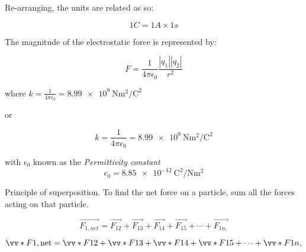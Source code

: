 \documentclass[letterpaper,12pt]{article}
\begin{document}
Re-arranging, the units are related as so:

\begin{equation}
	1C = 1A \times 1s
\end{equation}

The magnitude of the electrostatic force is represented by:

\begin{equation}
	F = \frac{1}{4\pi\epsilon_0}\frac{|q_1||q_2|}{r^2}
\end{equation}


where $k = \frac{1}{4\pi\epsilon_0} = \SI{8.99e9}{\newton\meter\squared\per\coulomb\squared}$

or

\begin{equation}
	k = \frac{1}{4\pi\epsilon_0} = \SI{8.99e9}{\newton\meter\squared\per\coulomb\squared}
\end{equation}

with $\epsilon_0$ known as the \textit{Permittivity constant}
\begin{equation}
	\epsilon_0 = \SI{8.85e-12}{\coulomb\squared\per\newton\meter\squared}
\end{equation}

Principle of superposition. To find the net force on a particle, sum all the forces acting on that
particle.

\begin{equation}
	\vec{F_{1,net}} = \vec{F_{12}} + \vec{F_{13}} + \vec{F_{14}} + \vec{F_{15}} + \cdots + \vec{F_{1n,}}
\end{equation}

\begin{equation}
	\vv*{F}{1,\text{net}} = \vv*{F}{12} + \vv*{F}{13} + \vv*{F}{14} + \vv*{F}{15} + \cdots + \vv*{F}{1n,}
\end{equation}


\end{document}
